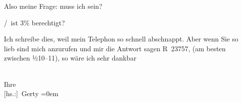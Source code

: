 \pstart
           Also meine Frage: muss ich  sein?\pend
           
/ ist 3{\%} berechtigt?\pend
           
\pstart
           Ich schreibe dies, weil mein Telephon so schnell abschnappt. Aber wenn Sie so lieb
               sind mich anzurufen und mir die Antwort sagen R 23757, (am besten zwischen
                  ½10–11), so wäre ich sehr dankbar\pend
           
\pstart
           \label{T_L02525-2v}\label{T_L02525-2}{\\[\baselineskip]}Ihre{\\[\baselineskip]}\spacefill\mbox{{[}hs.:{]} Gerty}\pend
           \leftskip=0em{}\endnumbering{}  \newcommand{\dateiname}{L02525}\newcommand{\titel}{Gerty Hofmannsthal an Arthur Schnitzler, 23. 11. 1929}\newcommand{\editorInnen}{Martin Anton Müller und Gerd-Hermann Susen}
